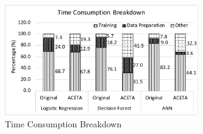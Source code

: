 \begin{figure}[h!]
	\centering
	\includegraphics[width=3.3in]{./fig/perf-breakdown.pdf}
	\caption{Time Consumption Breakdown}
	\label{figure:breakdown}
\end{figure}
